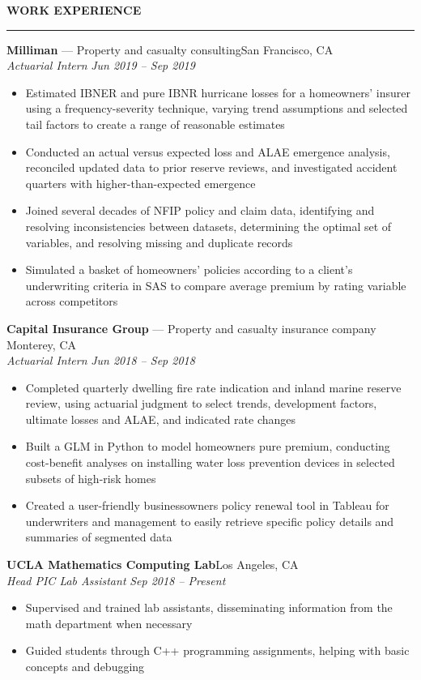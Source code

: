 \documentclass[11pt,letterpaper]{article}
\newcommand{\sectline}{\vspace{4pt}\hrule height 1.5pt\vspace{4pt}}
\newcommand{\sectspace}{\vspace{10pt}}
\newcommand{\smallspace}{\vspace{5pt}}
\begin{document}
\textbf{WORK EXPERIENCE}\sectline
\textbf{Milliman} --- Property and casualty consulting\hfill San Francisco, CA \\
\textit{Actuarial Intern} \hfill \textit{Jun 2019 -- Sep 2019}
\begin{itemize}
	\item Estimated IBNER and pure IBNR hurricane losses for a homeowners' insurer using a frequency-severity technique, varying trend assumptions and selected tail factors to create a range of reasonable estimates
	\item Conducted an actual versus expected loss and ALAE emergence analysis, reconciled updated data to prior reserve reviews, and investigated accident quarters with higher-than-expected emergence 
	\item Joined several decades of NFIP policy and claim data, identifying and resolving inconsistencies between datasets, determining the optimal set of variables, and resolving missing and duplicate records
	\item Simulated a basket of homeowners' policies according to a client's underwriting criteria in SAS to compare average premium by rating variable across competitors
\end{itemize}
\smallspace 
\textbf{Capital Insurance Group} --- Property and casualty insurance company \hfill Monterey, CA \\
\textit{Actuarial Intern} \hfill \textit{Jun 2018 -- Sep 2018}
\begin{itemize}
	\item Completed quarterly dwelling fire rate indication and inland marine reserve review, using actuarial judgment to select trends, development factors, ultimate losses and ALAE, and indicated rate changes
	\item Built a GLM in Python to model homeowners pure premium, conducting cost-benefit analyses on installing water loss prevention devices in selected subsets of high-risk homes 
	\item Created a user-friendly businessowners policy renewal tool in Tableau for underwriters and management to easily retrieve specific policy details and summaries of segmented data	
\end{itemize}
\smallspace 
\textbf{UCLA Mathematics Computing Lab}\hfill Los Angeles, CA \\
\textit{Head PIC Lab Assistant} \hfill \textit{Sep 2018 -- Present} \\
\begin{itemize}
	\item Supervised and trained lab assistants, disseminating information from the math department when necessary
	\item Guided students through C++ programming assignments, helping with basic concepts and debugging
\end{itemize}
\sectspace
\end{document}
